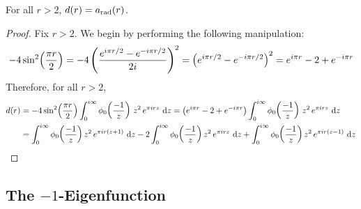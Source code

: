 \begin{boxproposition}
    For all $r > 2$, $d(r) = a_{\operatorname{rad}}(r)$.
\end{boxproposition}
\begin{proof}
    Fix $r > 2$. We begin by performing the following manipulation:
    \begin{align*}
        -4 \sin^2\!\left( \frac{\pi r}{2} \right)
        = -4 \left( \frac{e^{i \pi r / 2} - e^{-i \pi r / 2}}{2i} \right)^2
        = \left( e^{i \pi r / 2} - e^{- i \pi r / 2} \right)^2
        = e^{i \pi r} - 2 + e^{-i \pi r}
    \end{align*}
    Therefore, for all $r > 2$,
    \begin{align*}
        d(r)
        &= -4 \sinsq{\frac{\pi r}{2}} \int_{0}^{i \infty} \phi_0\of{\frac{-1}{z}} \, z^2 \, e^{\pi i r z} \, \diff{z}
        = \parenth{e^{i \pi r} - 2 + e^{-i \pi r}} \int_{0}^{i \infty} \phi_0\of{\frac{-1}{z}} \, z^2 \, e^{\pi i r z} \, \diff{z} \\
        &= \int_{0}^{i \infty} \phi_0\of{\frac{-1}{z}} z^2 \, e^{\pi i r \parenth{z + 1}} \, \diff{z}
        -2 \int_{0}^{i \infty} \phi_0\of{\frac{-1}{z}} z^2 \, e^{\pi i r z} \, \diff{z}
        + \int_{0}^{i \infty} \phi_0\of{\frac{-1}{z}} z^2 \, e^{\pi i r \parenth{z - 1}} \, \diff{z}
    \end{align*}
\end{proof}

\subsection{The $-1$-Eigenfunction}